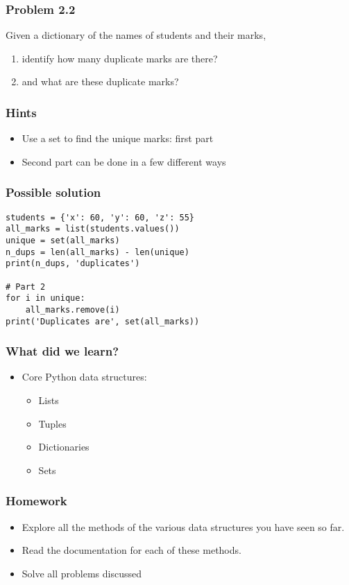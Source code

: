 \documentclass[14pt,compress]{beamer}
\begin{document}
\begin{frame}
  \frametitle{Problem 2.2}
  Given a dictionary of the names of students and their marks,

  \begin{enumerate}
  \item identify how many duplicate marks are there?
  \item and what are these duplicate marks?
  \end{enumerate}

\end{frame}

\begin{frame}
  \frametitle{Hints}
  \begin{itemize}
  \item Use a set to find the unique marks: first part
  \item Second part can be done in a few different ways
  \end{itemize}
\end{frame}

\begin{frame}[fragile]
  \frametitle{Possible solution}
\begin{lstlisting}
students = {'x': 60, 'y': 60, 'z': 55}
all_marks = list(students.values())
unique = set(all_marks)
n_dups = len(all_marks) - len(unique)
print(n_dups, 'duplicates')

# Part 2
for i in unique:
    all_marks.remove(i)
print('Duplicates are', set(all_marks))
\end{lstlisting}
\end{frame}

\begin{frame}
  \frametitle{What did we learn?}
  \begin{itemize}
    \item Core Python data structures:
    \begin{itemize}
      \item Lists
      \item Tuples
      \item Dictionaries
      \item Sets
    \end{itemize}
  \end{itemize}
\end{frame}

\begin{frame}
  \frametitle{Homework}

  \begin{itemize}
  \item Explore all the methods of the various data structures you have seen
    so far.
  \item Read the documentation for each of these methods.
  \item Solve all problems discussed
  \end{itemize}
\end{frame}
\end{document}
